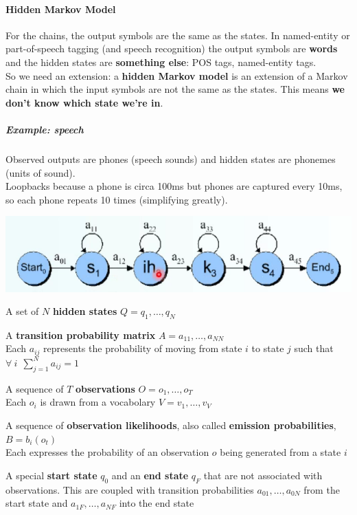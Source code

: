 \documentclass[10pt]{report}
\begin{document}
\paragraph{Hidden Markov Model} For the chains, the output symbols are the same as the states. In named-entity or part-of-speech tagging (and speech recognition) the output symbols are \textbf{words} and the hidden states are \textbf{something else}: POS tags, named-entity tags.\\
So we need an extension: a \textbf{hidden Markov model} is an extension of a Markov chain in which the input symbols are not the same as the states. This means \textbf{we don't know which state we're in}.
\subparagraph{Example: speech} Observed outputs are phones (speech sounds) and hidden states are phonemes (units of sound).\\
Loopbacks because a phone is circa 100ms but phones are captured every 10ms, so each phone repeats 10 times (simplifying greatly).
\begin{center}
	\includegraphics[scale=0.5]{14.png}
\end{center}
\begin{list}{}{}
	\item A set of $N$ \textbf{hidden states} $Q = q_1,\ldots,q_N$
	\item A \textbf{transition probability matrix} $A = a_{11},\ldots,a_{NN}$\\
	Each $a_{ij}$ represents the probability of moving from state $i$ to state $j$ such that $\forall\:i\:\:\sum_{j=1}^N a_{ij} = 1$
	\item A sequence of $T$ \textbf{observations} $O = o_1,\ldots,o_T$\\
	Each $o_i$ is drawn from a vocabolary $V = v_1,\ldots,v_V$
	\item A sequence of \textbf{observation likelihoods}, also called \textbf{emission probabilities}, $B = b_i(o_t)$\\
	Each expresses the probability of an observation $o$ being generated from a state $i$
	\item A special \textbf{start state} $q_0$ and an \textbf{end state} $q_F$ that are not associated with observations. This are coupled with transition probabilities $a_{01},\ldots,a_{0N}$ from the start state and $a_{1F},\ldots,a_{NF}$ into the end state
\end{list}
\end{document}
